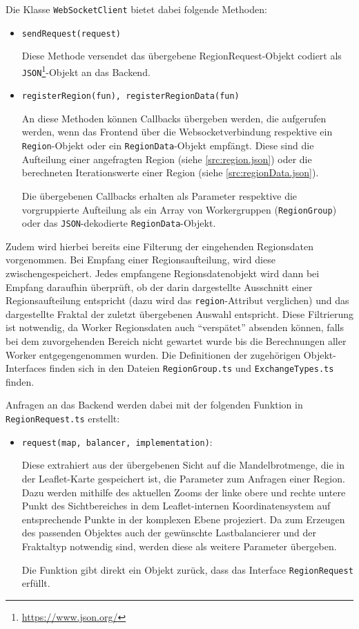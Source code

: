 Die Klasse \verb|WebSocketClient| bietet dabei folgende Methoden:
\begin{itemize}
	\item \verb|sendRequest(request)|

	      Diese Methode versendet das übergebene RegionRequest-Objekt codiert als \verb|JSON|\footnote{\url{https://www.json.org/}}-Objekt an das Backend.
	\item \verb|registerRegion(fun), registerRegionData(fun)|

	      An diese Methoden können Callbacks übergeben werden, die aufgerufen werden, wenn das Frontend über die Websocketverbindung
	      respektive ein \texttt{Region}-Objekt oder ein \texttt{RegionData}-Objekt empfängt.
	      Diese sind die Aufteilung einer angefragten Region (siehe \autoref{src:region.json})
	      oder die berechneten Iterationswerte einer Region (siehe \autoref{src:regionData.json}).

	      Die übergebenen Callbacks erhalten als Parameter respektive die vorgruppierte Aufteilung als ein Array von Workergruppen (\texttt{RegionGroup})
	      oder das \verb|JSON|-dekodierte \verb|RegionData|-Objekt.

\end{itemize}
Zudem wird hierbei bereits eine Filterung der eingehenden Regionsdaten vorgenommen.
Bei Empfang einer Regionsaufteilung, wird diese zwischengespeichert.
Jedes empfangene Regionsdatenobjekt wird dann bei Empfang daraufhin überprüft,
ob der darin dargestellte Ausschnitt einer Regionsaufteilung entspricht (dazu wird das \verb|region|-Attribut verglichen)
und das dargestellte Fraktal der zuletzt übergebenen Auswahl entspricht.
Diese Filtrierung ist notwendig, da Worker Regionsdaten auch \enquote{verspätet} absenden können,
falls bei dem zuvorgehenden Bereich nicht gewartet wurde bis die Berechnungen aller Worker entgegengenommen wurden.
Die Definitionen der zugehörigen Objekt-Interfaces finden sich in den Dateien \verb|RegionGroup.ts| und \verb|ExchangeTypes.ts| finden.

Anfragen an das Backend werden dabei mit der folgenden Funktion in \verb|RegionRequest.ts| erstellt:
\begin{itemize}
	\item \verb|request(map, balancer, implementation)|:

	      Diese extrahiert aus der übergebenen Sicht auf die Mandelbrotmenge, die in der Leaflet-Karte gespeichert ist,
	      die Parameter zum Anfragen einer Region.
	      Dazu werden mithilfe des aktuellen Zooms der linke obere und rechte untere Punkt des Sichtbereiches
	      in dem Leaflet-internen Koordinatensystem auf entsprechende Punkte in der komplexen Ebene projeziert.
	      Da zum Erzeugen des passenden Objektes auch der gewünschte Lastbalancierer und der Fraktaltyp notwendig sind,
	      werden diese als weitere Parameter übergeben.

	      Die Funktion gibt direkt ein Objekt zurück, dass das Interface \verb|RegionRequest| erfüllt.
\end{itemize}


